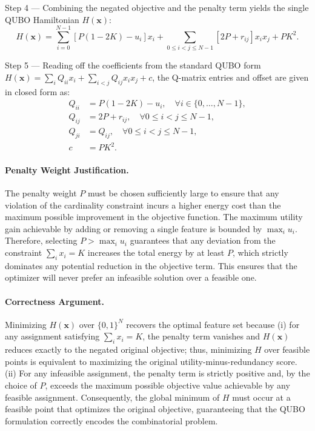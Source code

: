 \documentclass[12pt]{article}
\begin{document}
Step 4 --- Combining the negated objective and the penalty term yields the single QUBO Hamiltonian $H(\mathbf{x})$:
\[
H(\mathbf{x}) = \sum_{i=0}^{N-1} \left[ P(1 - 2K) - u_i \right] x_i + \sum_{0 \leq i < j \leq N-1} \left[ 2P + r_{ij} \right] x_i x_j + P K^2.
\]

Step 5 --- Reading off the coefficients from the standard QUBO form $H(\mathbf{x}) = \sum_{i} Q_{ii} x_i + \sum_{i < j} Q_{ij} x_i x_j + c$, the Q-matrix entries and offset are given in closed form as:
\begin{align}
Q_{ii} &= P(1 - 2K) - u_i, \quad \forall i \in \{0, \dots, N-1\}, \\
Q_{ij} &= 2P + r_{ij}, \quad \forall 0 \leq i < j \leq N-1, \\
Q_{ji} &= Q_{ij}, \quad \forall 0 \leq i < j \leq N-1, \\
c &= P K^2.
\end{align}

\paragraph{Penalty Weight Justification.}
The penalty weight $P$ must be chosen sufficiently large to ensure that any violation of the cardinality constraint incurs a higher energy cost than the maximum possible improvement in the objective function. The maximum utility gain achievable by adding or removing a single feature is bounded by $\max_i u_i$. Therefore, selecting $P > \max_i u_i$ guarantees that any deviation from the constraint $\sum_i x_i = K$ increases the total energy by at least $P$, which strictly dominates any potential reduction in the objective term. This ensures that the optimizer will never prefer an infeasible solution over a feasible one.

\paragraph{Correctness Argument.}
Minimizing $H(\mathbf{x})$ over $\{0,1\}^N$ recovers the optimal feature set because (i) for any assignment satisfying $\sum_i x_i = K$, the penalty term vanishes and $H(\mathbf{x})$ reduces exactly to the negated original objective; thus, minimizing $H$ over feasible points is equivalent to maximizing the original utility-minus-redundancy score. (ii) For any infeasible assignment, the penalty term is strictly positive and, by the choice of $P$, exceeds the maximum possible objective value achievable by any feasible assignment. Consequently, the global minimum of $H$ must occur at a feasible point that optimizes the original objective, guaranteeing that the QUBO formulation correctly encodes the combinatorial problem.
\end{document}
